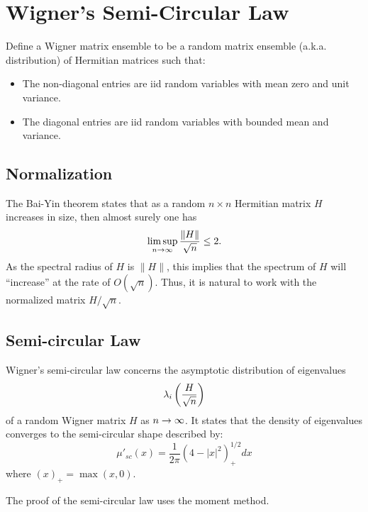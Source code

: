 \section{Wigner's Semi-Circular Law}

Define a Wigner matrix ensemble to be a random matrix ensemble (a.k.a. distribution) of Hermitian matrices such that:
\begin{itemize}
    \item The non-diagonal entries are iid random variables with mean zero and unit variance.
    \item The diagonal entries are iid random variables with bounded mean and variance.
\end{itemize}

\subsection{Normalization}
The Bai-Yin theorem states that as a random $n \times n$ Hermitian matrix $H$ increases in size, then almost surely one has
\[
    \limsup_{n \to \infty} \frac{\|H\|}{\sqrt{n}} \leq 2.
\]
As the spectral radius of $H$ is $\|H\|$, this implies that the spectrum of $H$ will ``increase'' at the rate of $O(\sqrt{n})$. Thus, it is natural to work with the normalized matrix $H/\sqrt{n}$.

\subsection{Semi-circular Law}
Wigner's semi-circular law concerns the asymptotic distribution of eigenvalues
\[
    \lambda_i\left( \frac{H}{\sqrt{n}}\right)
\]
of a random Wigner matrix $H$ as $n \to \infty$. It states that the density of eigenvalues converges to the semi-circular shape described by:
\[
    \mu'_{sc}(x) = \frac{1}{2\pi}(4 - |x|^2)^{1/2}_+dx
\]
where $(x)_+ = \max(x, 0)$.

The proof of the semi-circular law uses the moment method.
